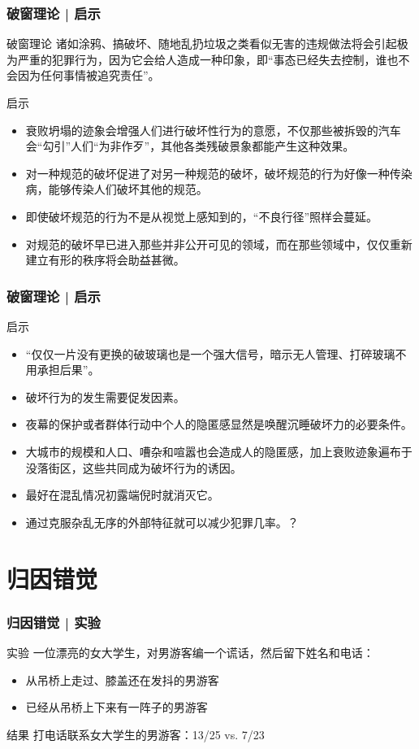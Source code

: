 \begin{frame}
  \frametitle{破窗理论 | 启示}
  \begin{block}{破窗理论}
    诸如涂鸦、搞破坏、随地乱扔垃圾之类看似无害的违规做法将会引起极为严重的犯罪行为，因为它会给人造成一种印象，即“事态已经失去控制，谁也不会因为任何事情被追究责任”。
  \end{block}
  \pause
  \begin{block}{启示}
    \begin{itemize}
      \item 衰败坍塌的迹象会增强人们进行破坏性行为的意愿，不仅那些被拆毁的汽车会“勾引”人们“为非作歹”，其他各类残破景象都能产生这种效果。
      \item 对一种规范的破坏促进了对另一种规范的破坏，破坏规范的行为好像一种传染病，能够传染人们破坏其他的规范。
      \item 即使破坏规范的行为不是从视觉上感知到的，“不良行径”照样会蔓延。
      \item 对规范的破坏早已进入那些并非公开可见的领域，而在那些领域中，仅仅重新建立有形的秩序将会助益甚微。
    \end{itemize}
  \end{block}
\end{frame}

\begin{frame}
  \frametitle{破窗理论 | 启示}
  \begin{block}{启示}
    \begin{itemize}
      \item “仅仅一片没有更换的破玻璃也是一个强大信号，暗示无人管理、打碎玻璃不用承担后果”。
      \item 破坏行为的发生需要促发因素。
      \item 夜幕的保护或者群体行动中个人的隐匿感显然是唤醒沉睡破坏力的必要条件。
      \item 大城市的规模和人口、嘈杂和喧嚣也会造成人的隐匿感，加上衰败迹象遍布于没落街区，这些共同成为破坏行为的诱因。
      \item 最好在混乱情况初露端倪时就消灭它。
      \item 通过克服杂乱无序的外部特征就可以减少犯罪几率。？
    \end{itemize}
  \end{block}
\end{frame}

\section{归因错觉}
\begin{frame}
  \frametitle{归因错觉 | 实验}
  \begin{block}{实验}
    一位漂亮的女大学生，对男游客编一个谎话，然后留下姓名和电话：
    \begin{itemize}
      \item 从吊桥上走过、膝盖还在发抖的男游客
      \item 已经从吊桥上下来有一阵子的男游客
    \end{itemize}
  \end{block}
  \pause
  \begin{block}{结果}
    打电话联系女大学生的男游客：13/25 vs. 7/23
  \end{block}
\end{frame}

